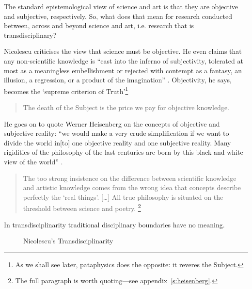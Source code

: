 \documentclass[11pt]{thesis} %
\begin{document}
The standard epistemological view of science and art is that they are objective and subjective, respectively. So, what does that mean for research conducted between, across and beyond science and art, i.e. research that is transdisciplinary?

Nicolescu criticises the view that science must be objective. He even claims that any non-scientific knowledge is ``cast into the inferno of subjectivity, tolerated at most as a meaningless embellishment or rejected with contempt as a fantasy, an illusion, a regression, or a product of the imagination'' \citeyear{Nicolescu2010}. Objectivity, he says, becomes the `supreme criterion of Truth'\footnote{As we shall see later, pataphysics does the opposite: it reveres the Subject.}

\begin{quotation}
  The death of the Subject is the price we pay for objective knowledge. 
\end{quotation}

He goes on to quote Werner Heisenberg on the concepts of objective and subjective reality: ``we would make a very crude simplification if we want to divide the world in[to] one objective reality and one subjective reality. Many rigidities of the philosophy of the last centuries are born by this black and white view of the world'' \autocite[Heisenberg, cited in][]{Nicolescu2010}.

\begin{quotation}
  The too strong insistence on the difference between scientific knowledge and artistic knowledge comes from the wrong idea that concepts describe perfectly the `real things'. [\ldots] All true philosophy is situated on the threshold between science and poetry.  \footnote{The full paragraph is worth quoting---see appendix~\ref{s:heisenberg}.}
\end{quotation}

In transdisciplinarity traditional disciplinary boundaries have no meaning.

\begin{figure}[!htbp]
\centering
  \caption[Nicolescu's Transdisciplinarity]{Nicolescu's Transdisciplinarity}
\label{fig:trans}
\end{figure}
\end{document}
